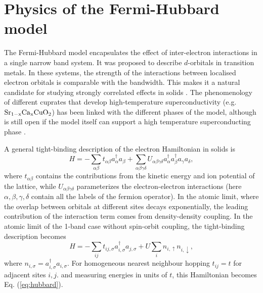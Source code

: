 \documentclass[aps,prb,twoside,superscriptaddress,longbibliography,nofootinbib,floatfix, notitlepage,twocolumn]{revtex4-1}
\begin{document}

\section{Physics of the Fermi-Hubbard model}

The Fermi-Hubbard model \cite{hubbard63} encapsulates the effect of inter-electron interactions in a single narrow band system. 
It was proposed to describe $d$-orbitals in transition metals.
In these systems, the strength of the interactions between localised electron orbitals is comparable with the bandwidth. This makes it a natural candidate for studying strongly correlated effects in solids \cite{DMFTreview}. 
The phenomenology of different cuprates that develop high-temperature superconductivity (e.g. $\rm{Sr}_{1-x}\rm{Ca}_x\rm{CuO}_2$) has been linked with the different phases of the model, although is still open if the model itself can support a high temperature superconducting phase \cite{Arovas_review2021}.

A general tight-binding description of the electron Hamiltonian in solids is
\begin{equation}
    H=-\sum_{\alpha\beta}t_{\alpha\beta}a^\dagger_\alpha a_\beta+\sum_{\alpha\beta\gamma\delta}U_{\alpha\beta\gamma\delta}a^\dagger_\alpha a^\dagger_\beta a_\gamma a_\delta,
\end{equation}
where $t_{\alpha\beta}$ contains the contributions from the kinetic energy and ion potential of the lattice, while $U_{\alpha\beta\gamma\delta}$ parameterizes the electron-electron interactions (here $\alpha, \beta, \gamma, \delta$ contain all the labels of the fermion operator). In the atomic limit, where the overlap between orbitals at different sites decays exponentially, the leading contribution of the interaction term comes from density-density coupling. In the atomic limit of the 1-band case without spin-orbit coupling, the tight-binding description becomes 
\begin{equation}
    H=-\sum_{ij}t_{ij,\sigma}a^\dagger_{i,\sigma} a_{j,\sigma}+U\sum_{i}n_{i,\uparrow}n_{i,\downarrow},
\end{equation}
where $n_{i,\sigma}=a^\dagger_{i,\sigma}a_{i,\sigma}$. For homogeneous nearest neighbour hopping $t_{ij}=t$ for adjacent sites $i,j$.
and measuring energies in units of $t$, this Hamiltonian becomes Eq. (\ref{eq:hubbard}).
\end{document}

